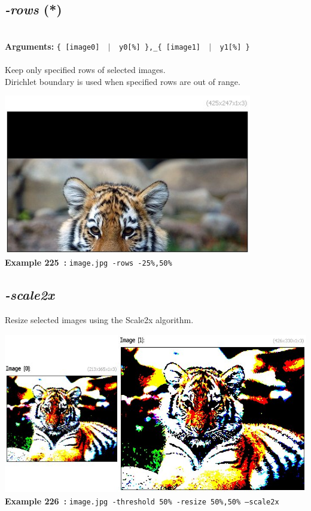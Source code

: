 \documentclass[a4paper,11pt,twoside]{book}
\begin{document}
\subsection{\emph{-rows} (*)}\vspace*{-0.5em}
~\\\textbf{Arguments: } 
{\small \texttt{\{ [image0] ~$|$~ y0[\%] \},\_\{ [image1] ~$|$~ y1[\%] \}}}\\~\\
Keep only specified rows of selected images.
~\\Dirichlet boundary is used when specified rows are out of range.
\begin{center}\includegraphics[keepaspectratio=true,height=7cm,width=\textwidth]{img/gmic_def225.jpg}\\
{\footnotesize \textbf{Example 225~:} \texttt{image.jpg -rows -25\%,50\%}}
\end{center}

\subsection{\emph{-scale2x} }\vspace*{-0.5em}
Resize selected images using the Scale2x algorithm.
\begin{center}\includegraphics[keepaspectratio=true,height=7cm,width=\textwidth]{img/gmic_def226.jpg}\\
{\footnotesize \textbf{Example 226~:} \texttt{image.jpg -threshold 50\% -resize 50\%,50\% --scale2x}}
\end{center}
\end{document}
